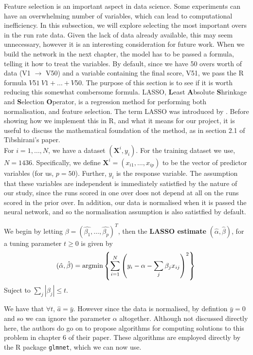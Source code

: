 Feature selection is an important aspect in data science. Some experiments can have an overwhelming number of variables, which can lead to computational inefficiency. In this subsection, we will explore selecting the most important overs in the run rate data.
Given the lack of data already available, this may seem unnecessary, however it is an interesting consideration for future work. When we build the network in the next chapter, the model has to be passed a formula, telling it how to treat the variables. By default, since we have 50 overs worth of data (V1 $\rightarrow$ V50) and a variable containing the final score, V51, we pass the R formula $V51 ~ V1 + \ldots + V50$. The purpose of this section is to see if it is worth reducing this somewhat combersome formula. 
LASSO, \textbf{L}east \textbf{A}bsolute \textbf{S}hrinkage and \textbf{S}election \textbf{O}perator, is a regression method for performing both normalisation, and feature selection. The term LASSO was introduced by \cite{tib}. Before showing how we implement this in R, and what it means for our project, it is useful to discuss the mathematical foundation of the method, as in section 2.1 of Tibshirani's paper. \\

For $i=1,\ldots,N$, we have a dataset $(\textbf{X}^i,y_i)$. For the training dataset we use, $N=1436$. Specifically, we define $\textbf{X}^i = (x_{i1},\ldots,x_{ip})$ to be the vector of predictor variables (for us, $p=50$). Further, $y_i$ is the response variable. The assumption that these variables are independent is immediately satistfied by the nature of our study, since the runs scored in one over does not depend at all on the runs scored in the prior over. In addition, our data is normalised when it is passed the neural network, and so the normalisation assumption is also satistfied by default. 

\begin{definition}
    We begin by letting $\beta = (\hat{\beta_1},\ldots,\hat{\beta_p})^T$, then the \textbf{LASSO estimate} $(\hat{\alpha}, \hat{\beta})$, for a tuning parameter $t \geq 0$ is given by
    \[
        (\hat{\alpha},\hat{\beta}) = \text{argmin} \left\{ \sum_{i=1}^N \left(y_i - \alpha - \sum_j \beta_j x_{ij} \right)^2 \right\} \\
    \]
    Suject to $\sum_j |\beta_j| \leq t$. 
\end{definition}

We have that $\forall t$, $\hat{a} = \bar{y}$. However since the data is normalised, by defintion $\bar{y}=0$ and so we can ignore the parameter $\alpha$ altogether. Although not discussed directly here, the authors do go on to propose algorithms for computing solutions to this problem in chapter 6 of their paper. These algorithms are employed directly by the R package \verb|glmnet|, which we can now use. \\

